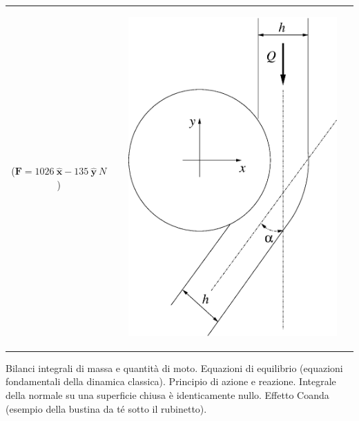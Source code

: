 \begin{tabular}{cc}
\begin{minipage}{0.60\textwidth}
\begin{exerciseS}
($\bm{F} = 1026\ \hat{\bm{x}} - 135\ \hat{\bm{y}} \ N$)
\end{exerciseS}
\end{minipage}
&
\begin{minipage}{0.35\textwidth}
   \begin{center}
   \includegraphics[width=0.90\textwidth]{./fig/coanda.eps}
   \end{center}
\end{minipage}
\end{tabular}

\vspace{1.0cm}

\sol

\partone
  Bilanci integrali di massa e quantità di moto. Equazioni di equilibrio (equazioni fondamentali della dinamica classica). Principio di azione e reazione. Integrale della normale su una superficie chiusa è identicamente nullo. Effetto Coanda (esempio della bustina da té sotto il rubinetto).

